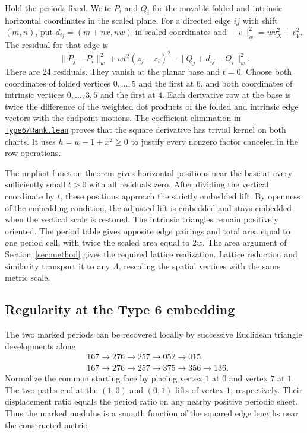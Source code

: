 \documentclass[11pt,letterpaper]{amsart}
\newcommand{\release}{bd3a0e03908481d738df30233cf95c641a1d3f71}
\newcommand{\src}[2]{\href{https://github.com/vltanh/lean4-origami-torus/blob/\release/#1}{\texttt{#2}}}
\begin{document}
Hold the periods fixed. Write \(P_i\) and \(Q_i\) for the movable
folded and intrinsic horizontal coordinates in the scaled
plane. For a directed edge \(ij\) with shift \((m,n)\), put
\(d_{ij}=(m+nx,nw)\) in scaled coordinates and
\(\|v\|_w^2=w v_X^2+v_Y^2\). The residual for that edge is
\[
 \|P_j-P_i\|_w^2+w t^2(z_j-z_i)^2
       -\|Q_j+d_{ij}-Q_i\|_w^2.
 \tag{2}\label{eq:residual}
\]
There are 24 residuals. They vanish at the planar base and \(t=0\).
Choose both coordinates of folded vertices \(0,\ldots,5\) and the
first at \(6\), and both coordinates of intrinsic vertices
\(0,\ldots,3,5\) and the first at \(4\). Each derivative row at the
base is twice the difference of the weighted dot products of the
folded and intrinsic edge vectors with the endpoint motions.
The coefficient elimination in
\src{OrigamiTorus/EightVertex/Type6/Rank.lean}{Type6/Rank.lean}
proves that the square derivative has trivial kernel on both
charts. It uses \(h=w-1+x^2\ge0\) to justify every nonzero factor
canceled in the row operations.

The implicit function theorem gives horizontal positions near the
base at every sufficiently small \(t>0\) with all residuals zero.
After dividing the vertical coordinate by \(t\), these positions
approach the strictly embedded lift. By openness of the embedding
condition, the adjusted lift is embedded and stays embedded when
the vertical scale is restored. The intrinsic triangles remain
positively oriented. The period table gives opposite edge pairings
and total area equal to one period cell, with twice the scaled
area equal to \(2w\). The area argument of
Section~\ref{sec:method} gives the required lattice realization.
Lattice reduction and similarity transport it to any \(\Lambda\),
rescaling the spatial vertices with the same metric scale.

\subsection*{Regularity at the Type 6 embedding}

The two marked periods can be recovered locally by successive
Euclidean triangle developments along
\[
 \begin{aligned}
 &167\to276\to257\to052\to015,\\
 &167\to276\to257\to375\to356\to136.
 \end{aligned}
\]
Normalize the common starting face by placing vertex \(1\) at \(0\)
and vertex \(7\) at \(1\). The two paths end at the \((1,0)\) and
\((0,1)\) lifts of vertex \(1\), respectively. Their displacement
ratio equals the period ratio on any nearby positive periodic
sheet. Thus the marked modulus is a smooth function of the squared
edge lengths near the constructed metric.
\end{document}
